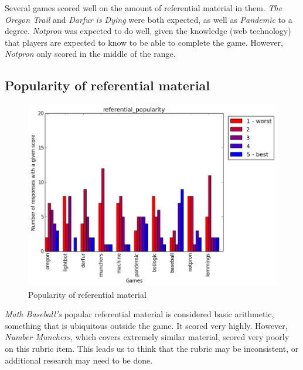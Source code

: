 				Several games scored well on the amount of referential material in them. \textit{The Oregon Trail} and \textit{Darfur is Dying} were both expected, as well as \textit{Pandemic} to a degree. \textit{Notpron} was expected to do well, given the knowledge (web technology) that players are expected to know to be able to complete the game. However, \textit{Notpron} only scored in the middle of the range.

			\subsection{Popularity of referential material}
				\begin{figure}[] 
				\centering 
				\includegraphics[width=\textwidth, height=.4\textheight, keepaspectratio=true]{referential_popularity_scores.png} 
				\caption{Popularity of referential material}
				\end{figure}

				\textit{Math Baseball's} popular referential material is considered basic arithmetic, something that is ubiquitous outside the game. It scored very highly. However, \textit{Number Munchers}, which covers extremely similar material, scored very poorly on this rubric item. This leads us to think that the rubric may be inconsistent, or additional research may need to be done.

